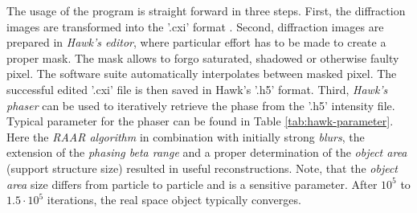 The usage of the program is straight forward in three steps. First, the diffraction images are transformed into the '.cxi' format \citep{Maia-2012-NatMet}. Second, diffraction images are prepared in \textit{Hawk's editor}, where particular effort has to be made to create a proper mask. The mask  allows to forgo saturated, shadowed or otherwise faulty pixel. The software suite automatically interpolates between masked pixel. The successful edited '.cxi' file is then saved in Hawk's '.h5' format. Third, \textit{Hawk's phaser} can be used to iteratively retrieve the phase from the '.h5' intensity file. Typical parameter for the phaser can be found in Table \ref{tab:hawk-parameter}. Here the \textit{RAAR algorithm} \cite{Luke-2005-IP} in combination with initially strong \textit{blurs}, the extension of the \textit{phasing beta range} and a proper determination of the \textit{object area} (support structure size) resulted in useful reconstructions. Note, that the \textit{object area} size differs from particle to particle and is a sensitive parameter. After $10^{5}$ to $1.5\cdot 10^{5}$ iterations, the real space object typically converges.
%
%
%
